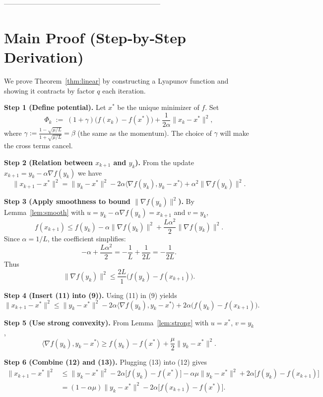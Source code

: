\documentclass{article}
\begin{document}
--------------------------------------------------------------------
\section*{Main Proof (Step‑by‑Step Derivation)}
We prove Theorem~\ref{thm:linear} by constructing a Lyapunov function and showing it contracts by factor $q$ each iteration.

\noindent\textbf{Step 1 (Define potential).}  
Let $x^{\ast}$ be the unique minimizer of $f$. Set
\[
\Phi_k\;:=\; (1+\gamma)\bigl(f(x_k)-f(x^{\ast})\bigr)+\frac{1}{2\alpha}\|x_k-x^{\ast}\|^{2},
\tag{8}
\]
where $\gamma:=\frac{1-\sqrt{\mu/L}}{1+\sqrt{\mu/L}}=\beta$ (the same as the momentum).  
The choice of $\gamma$ will make the cross terms cancel.

\noindent\textbf{Step 2 (Relation between $x_{k+1}$ and $y_k$).}  
From the update $x_{k+1}=y_k-\alpha\nabla f(y_k)$ we have
\[
\|x_{k+1}-x^{\ast}\|^{2}
= \|y_k-x^{\ast}\|^{2}-2\alpha\langle\nabla f(y_k),y_k-x^{\ast}\rangle+\alpha^{2}\|\nabla f(y_k)\|^{2}.
\tag{9}
\]

\noindent\textbf{Step 3 (Apply smoothness to bound $\|\nabla f(y_k)\|^{2}$).}  
By Lemma~\ref{lem:smooth} with $u=y_k-\alpha\nabla f(y_k)=x_{k+1}$ and $v=y_k$,
\[
f(x_{k+1})\le f(y_k)-\alpha\|\nabla f(y_k)\|^{2}+\frac{L\alpha^{2}}{2}\|\nabla f(y_k)\|^{2}.
\tag{10}
\]
Since $\alpha=1/L$, the coefficient simplifies:
\[
-\alpha+\frac{L\alpha^{2}}{2}= -\frac{1}{L}+\frac{1}{2L}= -\frac{1}{2L}.
\]
Thus
\[
\|\nabla f(y_k)\|^{2}\le \frac{2L}{1}\bigl(f(y_k)-f(x_{k+1})\bigr).
\tag{11}
\]

\noindent\textbf{Step 4 (Insert (11) into (9)).}  
Using (11) in (9) yields
\[
\|x_{k+1}-x^{\ast}\|^{2}
\le \|y_k-x^{\ast}\|^{2}-2\alpha\langle\nabla f(y_k),y_k-x^{\ast}\rangle
+2\alpha\bigl(f(y_k)-f(x_{k+1})\bigr).
\tag{12}
\]

\noindent\textbf{Step 5 (Use strong convexity).}  
From Lemma~\ref{lem:strong} with $u=x^{\ast}$, $v=y_k$,
\[
\langle\nabla f(y_k),y_k-x^{\ast}\rangle\ge f(y_k)-f(x^{\ast})+\frac{\mu}{2}\|y_k-x^{\ast}\|^{2}.
\tag{13}
\]

\noindent\textbf{Step 6 (Combine (12) and (13)).}  
Plugging (13) into (12) gives
\[
\begin{aligned}
\|x_{k+1}-x^{\ast}\|^{2}
&\le \|y_k-x^{\ast}\|^{2}
-2\alpha\bigl[f(y_k)-f(x^{\ast})\bigr]
-\alpha\mu\|y_k-x^{\ast}\|^{2}
+2\alpha\bigl[f(y_k)-f(x_{k+1})\bigr]\\[4pt]
&= (1-\alpha\mu)\|y_k-x^{\ast}\|^{2}
-2\alpha\bigl[f(x_{k+1})-f(x^{\ast})\bigr].
\end{aligned}
\tag{14}
\]
\end{document}
